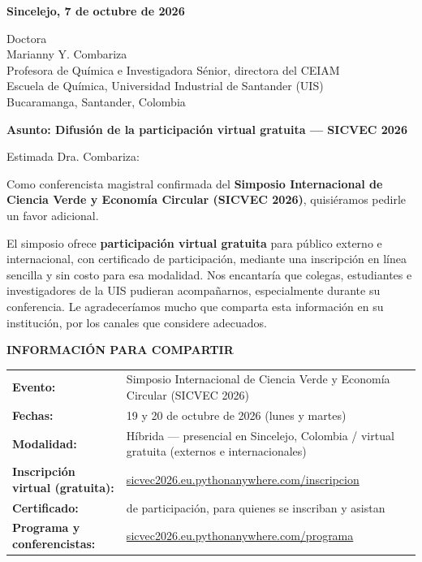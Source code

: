 \documentclass[11pt,a4paper]{article}
\begin{document}
\vspace{0.1cm}

\noindent
\textbf{Sincelejo, 7 de octubre de 2026}

\vspace{0.15cm}

\noindent
Doctora\\
Marianny Y. Combariza\\
Profesora de Química e Investigadora Sénior, directora del CEIAM\\
Escuela de Química, Universidad Industrial de Santander (UIS)\\
Bucaramanga, Santander, Colombia

\vspace{0.15cm}

\noindent
\textbf{\large Asunto: Difusión de la participación virtual gratuita — SICVEC 2026}

\vspace{0.15cm}

Estimada Dra. Combariza:

\vspace{0.1cm}

Como conferencista magistral confirmada del \textbf{Simposio Internacional de Ciencia Verde y Economía Circular (SICVEC 2026)}, quisiéramos pedirle un favor adicional.

El simposio ofrece \textbf{participación virtual gratuita} para público externo e internacional, con certificado de participación, mediante una inscripción en línea sencilla y sin costo para esa modalidad. Nos encantaría que colegas, estudiantes e investigadores de la UIS pudieran acompañarnos, especialmente durante su conferencia. Le agradeceríamos mucho que comparta esta información en su institución, por los canales que considere adecuados.

\vspace{0.1cm}

\noindent
\textbf{INFORMACIÓN PARA COMPARTIR}

\begin{tabular}{ll}
\textbf{Evento:} & Simposio Internacional de Ciencia Verde y Economía Circular (SICVEC 2026) \\
\textbf{Fechas:} & 19 y 20 de octubre de 2026 (lunes y martes) \\
\textbf{Modalidad:} & Híbrida — presencial en Sincelejo, Colombia / virtual gratuita (externos e internacionales) \\
\textbf{Inscripción virtual (gratuita):} & \href{https://sicvec2026.eu.pythonanywhere.com/inscripcion}{sicvec2026.eu.pythonanywhere.com/inscripcion} \\
\textbf{Certificado:} & de participación, para quienes se inscriban y asistan \\
\textbf{Programa y conferencistas:} & \href{https://sicvec2026.eu.pythonanywhere.com/programa}{sicvec2026.eu.pythonanywhere.com/programa} \\
\end{tabular}
\end{document}
